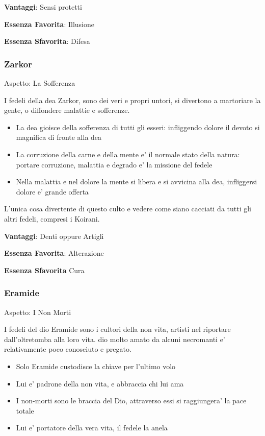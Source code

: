 \documentclass[a4paper,11pt,twoside,openany]{book}
\begin{document}
\textbf{Vantaggi}: Sensi protetti

\textbf{Essenza Favorita}: Illusione

\textbf{Essenza Sfavorita}: Difesa
\bigskip


\subsubsection{Zarkor}

Aspetto: La Sofferenza
\bigskip


I fedeli della dea Zarkor, sono dei veri e propri untori, si divertono a martoriare la gente, o diffondere malattie e sofferenze.

\begin{itemize}
	\item La dea gioisce della sofferenza di tutti gli esseri: infliggendo dolore il devoto si magnifica di fronte alla dea
	\item La corruzione della carne e della mente e' il normale stato della natura: portare corruzione, malattia e degrado e' la missione del fedele
	\item Nella malattia e nel dolore la mente si libera e si avvicina alla dea, infliggersi dolore e' grande offerta
\end{itemize}

L'unica cosa divertente di questo culto e vedere come siano cacciati da tutti gli altri fedeli, compresi i Koirani.


\textbf{Vantaggi}: Denti oppure Artigli

\textbf{Essenza Favorita}: Alterazione

\textbf{Essenza Sfavorita} Cura
\bigskip

\subsubsection{Eramide}

Aspetto: I Non Morti
\bigskip

I fedeli del dio Eramide sono i cultori della non vita, artisti nel riportare dall'oltretomba alla loro vita. dio molto amato da alcuni necromanti e' relativamente poco conosciuto e pregato.


\begin{itemize}
	\item Solo Eramide custodisce la chiave per l'ultimo volo
	\item Lui e' padrone della non vita, e abbraccia chi lui ama
	\item I non-morti sono le braccia del Dio, attraverso essi si raggiungera' la pace totale
	\item Lui e' portatore della vera vita, il fedele la anela
\end{itemize}
\end{document}
